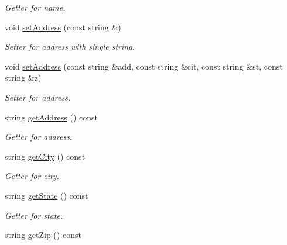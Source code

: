 \begin{DoxyCompactItemize}
\begin{DoxyCompactList}\small\item\em Getter for name. \end{DoxyCompactList}\item 
void \hyperlink{classClient_a8a035b3e170849283f8b130965c5fa75}{set\+Address} (const string \&)\hypertarget{classClient_a8a035b3e170849283f8b130965c5fa75}{}\label{classClient_a8a035b3e170849283f8b130965c5fa75}

\begin{DoxyCompactList}\small\item\em Setter for address with single string. \end{DoxyCompactList}\item 
void \hyperlink{classClient_a69b7a62c15ec787ae86bb66ce4ad312a}{set\+Address} (const string \&add, const string \&cit, const string \&st, const string \&z)
\begin{DoxyCompactList}\small\item\em Setter for address. \end{DoxyCompactList}\item 
string \hyperlink{classClient_a291fb22c4fccb2a6b182c355078553ed}{get\+Address} () const 
\begin{DoxyCompactList}\small\item\em Getter for address. \end{DoxyCompactList}\item 
string \hyperlink{classClient_ad92aa60043bd899cdad19b9ca6a77a2e}{get\+City} () const \hypertarget{classClient_ad92aa60043bd899cdad19b9ca6a77a2e}{}\label{classClient_ad92aa60043bd899cdad19b9ca6a77a2e}

\begin{DoxyCompactList}\small\item\em Getter for city. \end{DoxyCompactList}\item 
string \hyperlink{classClient_adf5ae51b9e301019f229b6dd6893f550}{get\+State} () const \hypertarget{classClient_adf5ae51b9e301019f229b6dd6893f550}{}\label{classClient_adf5ae51b9e301019f229b6dd6893f550}

\begin{DoxyCompactList}\small\item\em Getter for state. \end{DoxyCompactList}\item 
string \hyperlink{classClient_a4595dcdc42fc6dfbf7b53a3dd495b4f1}{get\+Zip} () const \hypertarget{classClient_a4595dcdc42fc6dfbf7b53a3dd495b4f1}{}\label{classClient_a4595dcdc42fc6dfbf7b53a3dd495b4f1}


\end{DoxyCompactItemize}

